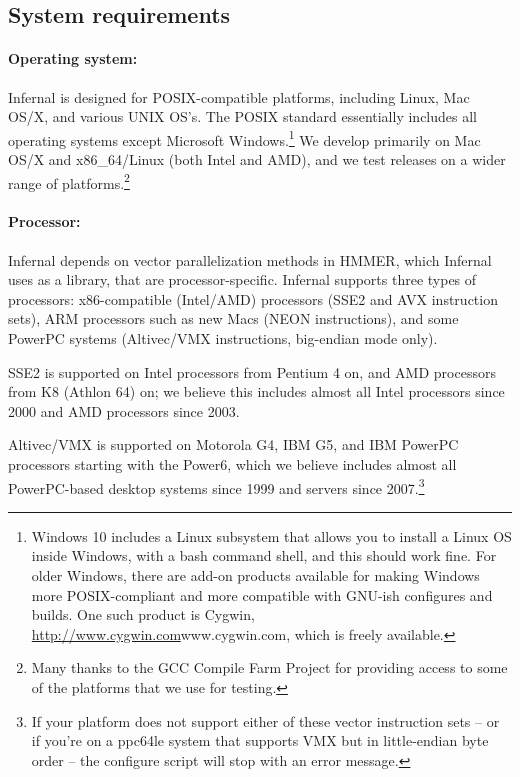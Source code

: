 \subsection{System requirements}

\paragraph{Operating system:} Infernal is designed for
POSIX-compatible platforms, including Linux, Mac OS/X, and various
UNIX OS's. The POSIX standard essentially includes all operating
systems except Microsoft Windows.\footnote{Windows 10 includes a Linux
  subsystem that allows you to install a Linux OS inside Windows, with
  a bash command shell, and this should work fine. For older Windows,
  there are add-on products available for making Windows more
  POSIX-compliant and more compatible with GNU-ish configures and
  builds. One such product is Cygwin,
  \url{http://www.cygwin.com}{www.cygwin.com}, which is freely
  available.}  We develop primarily on Mac OS/X and x86\_64/Linux
(both Intel and AMD), and we test releases on a wider range of
platforms.\footnote{Many thanks to the GCC Compile Farm Project for
  providing access to some of the platforms that we use for testing.}

\paragraph{Processor:} Infernal depends on vector parallelization methods
in HMMER, which Infernal uses as a library, that are
processor-specific. Infernal supports three types of processors:
x86-compatible (Intel/AMD) processors (SSE2 and AVX instruction sets),
ARM processors such as new Macs (NEON instructions), and some PowerPC
systems (Altivec/VMX instructions, big-endian mode only).

SSE2 is supported on Intel processors from Pentium 4 on, and AMD
processors from K8 (Athlon 64) on; we believe this includes almost all
Intel processors since 2000 and AMD processors since 2003.

Altivec/VMX is supported on Motorola G4, IBM G5, and IBM PowerPC
processors starting with the Power6, which we believe includes almost
all PowerPC-based desktop systems since 1999 and servers since
2007.\footnote{If your platform does not support either of these
  vector instruction sets -- or if you're on a ppc64le system that
  supports VMX but in little-endian byte order -- the configure script
  will stop with an error message.}

